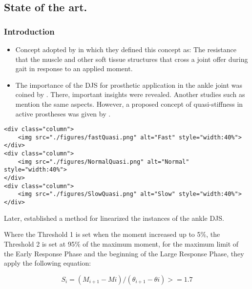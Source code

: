 \documentclass[11pt]{article}
\providecommand{\tightlist}{%
      \setlength{\itemsep}{0pt}\setlength{\parskip}{0pt}}
\begin{document}
    \hypertarget{state-of-the-art.}{%
\subsection{State of the art.}\label{state-of-the-art.}}

    \hypertarget{introduction}{%
\subsubsection{Introduction}\label{introduction}}

\begin{itemize}
\tightlist
\item
  Concept adopted by \cite{Davis1996} in which they defined this concept
  as: The resistance that the muscle and other soft tissue structures
  that cross a joint offer during gait in response to an applied moment.
\end{itemize}

    \begin{itemize}
\tightlist
\item
  The importance of the DJS for prosthetic application in the ankle
  joint was coined by \cite{Hansen2004}. There, important insights were
  revealed. Another studies such as \cite{Safaeepour2014} mention the
  same aspects. However, a proposed concept of quasi-stiffness in active
  prostheses was given by \cite{Rouse2013a}.
\end{itemize}

\begin{verbatim}
<div class="column">
    <img src="./figures/fastQuasi.png" alt="Fast" style="width:40%">
</div>
<div class="column">
    <img src="./figures/NormalQuasi.png" alt="Normal" style="width:40%">
</div>
<div class="column">
    <img src="./figures/SlowQuasi.png" alt="Slow" style="width:40%">
</div>
\end{verbatim}

    Later, \cite{Crenna2011} established a method for linearized the
instances of the ankle DJS.

Where the Threshold 1 is set when the moment increased up to 5\%, the
Threshold 2 is set at 95\% of the maximum moment, for the maximum limit
of the Early Response Phase and the beginning of the Large Response
Phase, they apply the following equation:

\begin{equation}
S_{i} = (M_{i+1}-M{i})/(\theta_{i+1}-\theta{i}) >= 1.7
\end{equation}
\end{document}
